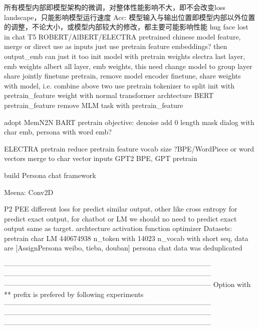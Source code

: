 \documentclass[letterpaper]{article} %
\begin{document}
\begin{CJK*}{UTF8}{gbsn}
      所有模型内部即模型架构的微调，对整体性能影响不大，即不会改变loss landscape，只能影响模型运行速度
  Acc:
      模型输入与输出位置即模型内部以外位置的调整，不论大小，或模型内部较大的修改，都主要可能影响性能
      hug face
      lost in chat
      T5
      ROBERT/AlBERT/ELECTRA pretrained chinese model feature, merge or direct use as inputs
      just use pretrain feature embeddings? then output_emb can just it too
      init model with pretrain weights
        electra last layer, emb weights
        albert all layer, emb weights, this need change model to group layer share
      jointly finetune pretrain, remove model encoder
      finetune, share weights with model, i.e. combine above two
      use pretrain tokenizer to split
      init with pretrain_feature weight with normal transformer archtecture
      BERT pretrain_feature
      remove MLM task with pretrain_feature

      adopt MemN2N 
      BART pretrain objective: denoise add 0 length mask
      dialog with char emb, persona with word emb?

      ELECTRA pretrain
      reduce pretrain feature vocab size
      ?BPE/WordPiece or word vectors merge to char vector inputs
      GPT2 BPE, GPT pretrain

      build Persona chat framework

      Meena: Conv2D

      P2
      PEE
      different loss for predict similar output, 
        other like cross entropy for predict exact output,
        for chatbot or LM we should no need to predict exact output same as target. 
      archtecture
      activation function
      optimizer
  Datasets:
      pretrain char LM 440674938 n_token with 14023 n_vocab with short seq, data are [AssignPersona weibo, tieba, douban]
      persona chat data was deduplicated 

-----------------------------------------------------------------------------------------
-----------------------------------------------------------------------------------------
-----------------------------------------------------------------------------------------
Option with ** prefix is prefered by following experiments
-----------------------------------------------------------------------------------------
-----------------------------------------------------------------------------------------
-----------------------------------------------------------------------------------------


\end{CJK*}
\end{document}
